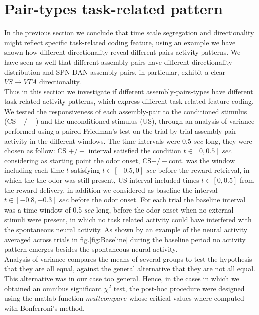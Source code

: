  \section{Pair-types task-related pattern}
 \label{sec:TaskResp}
In the previous section we conclude that time scale segregation and directionality might reflect specific task-related coding feature, using an example we have shown how different directionality reveal different pairs activity patterns. We have seen as well that different assembly-pairs have different directionality distribution and SPN-DAN assembly-pairs, in particular, exhibit a clear $VS\rightarrow VTA$ directionality.\\Thus in this section we investigate if different assembly-pairs-types have different task-related activity patterns, which express different task-related feature coding.\\
We tested the responsiveness of each assembly-pair to the conditioned stimulus (CS $+/-$) and the unconditioned stimulus (US), through an analysis of variance performed using a paired Friedman's test on the trial by trial assembly-pair activity in the different windows. The time intervals were 0.5 $sec$ long, they were chosen as follow: CS $+/-$ interval satisfied the condition $t \in [0, 0.5]$ $sec$ considering as starting point the odor onset, CS$+/-$cont. was the window including each time $t$ satisfying $t \in [-0.5, 0]$ $sec$ before the reward retrieval, in which the the odor was still present, US interval included times $t \in [0,0.5]$ from the reward delivery, in addition we considered as baseline the interval $t \in [-0.8, -0.3]$ $sec$ before the odor onset. For each trial the baseline interval was a time window of 0.5 $sec$ long, before the odor onset when no external stimuli were present, in which no task related activity could have interfered with the spontaneous neural activity. As shown by an example of the neural activity averaged across trials in fig.\ref{fig:Baseline} during the baseline period no activity pattern emerges besides the spontaneous neural activity.\\
Analysis of variance compares the means of several groups to test the hypothesis that they are all equal, against the general alternative that they are not all equal. This alternative was in our case too general. Hence, in the cases in which we obtained an omnibus significant $\chi^2$ test, the post-hoc procedure were designed using the matlab function $\textit{multcompare}$ whose critical values where computed with Bonferroni's method.\\
